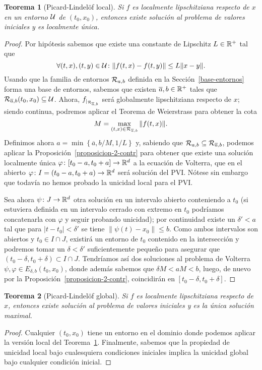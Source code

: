 \documentclass[11pt]{article}
\theoremstyle{plain}
\newtheorem{theorem}{Teorema}
\theoremstyle{definition}
\theoremstyle{remark}
\begin{document}
\begin{theorem}[Picard-Lindelöf local]\label{picard-lindelof-local}
  Si \(f\) es localmente lipschitziana respecto de \(x\) en un entorno ${\cal U}$ de \((t_0,x_0)\),
  entonces existe solución al problema de valores iniciales y es
  localmente única.
\end{theorem}
\begin{proof}
  Por hipótesis sabemos que existe una constante de Lipschitz $L \in \mathbb{R}^+$
  tal que
  \[ \forall (t,x),(t,y) \in {\cal U}\colon \| f(t,x) - f(t,y) \| \leq L\|x-y\|. \]
  Usando que la familia de entornos ${{\cal{R}}}_{a,b}$ definida en la Sección~\ref{base-entornos}
  forma una base de entornos, sabemos que existen $\overline{a},b \in \mathbb{R}^+$ tales que ${{\cal{R}}}_{\overline{a},b}(t_0,x_0) \subseteq {\cal U}$.
  Ahora, $f_{|_{{{\cal{R}}}_{\overline{a},b}}}$ será globalmente lipschitziana respecto de $x$;
  siendo continua, podremos aplicar el Teorema de Weierstrass para obtener la cota
  \[M = \max_{(t,x) \in {{\cal{R}}}_{\overline{a},b}} \|f(t,x)\|.\]
  Definimos ahora $a = \min\left\{ \overline{a}, b/M, 1/L \right\}$ y, sabiendo que ${{\cal{R}}}_{a,b} \subseteq {{\cal{R}}}_{\overline{a},b}$, podemos aplicar
  la Proposición~\ref{proposicion-2-contr} para obtener que existe una solución
  localmente única $\varphi \colon [t_0-a,t_0+a] \to \mathbb{R}^d$ a la ecuación de Volterra, que en el
  abierto $\varphi \colon I = (t_0-a,t_0+a) \to \mathbb{R}^d$ será solución del PVI\@. Nótese sin embargo que
  todavía no hemos probado la unicidad local para el PVI\@.
  
  Sea ahora $\psi \colon J \to \mathbb{R}^d$ otra solución en un intervalo abierto conteniendo
  a $t_0$ (si estuviera definida en un intervalo cerrado con extremo en $t_0$ podríamos
  concatenarla con $\varphi$ y seguir probando unicidad); por continuidad existe un $\delta' < a$
  tal que para $|t - t_0| < \delta'$ se tiene $\|\psi(t) - x_0\| \leq b$. Como ambos
  intervalos son abiertos y $t_0 \in I \cap J$, existirá
  un entorno de $t_0$ contenido en la intersección y podremos tomar un
  $\delta < \delta'$ suficientemente pequeño para asegurar que $(t_0-\delta, t_0+\delta) \subset I \cap J$.
  Tendríamos así dos soluciones al problema de Volterra $\psi,\varphi \in E_{\delta,b}(t_0,x_0)$,
  donde además sabemos que $\delta M < aM < b$, luego, de nuevo por la
  Proposición~\ref{proposicion-2-contr}, coincidirán en $[t_0-\delta,t_0+\delta]$.
\end{proof}


\begin{theorem}[Picard-Lindelöf global]\label{picard-lindelof-global}
  Si \(f\) es localmente lipschitziana respecto de \(x\), entonces existe solución
  al problema de valores iniciales y es la única solución maximal.
\end{theorem}
\begin{proof}
  Cualquier $(t_0,x_0)$ tiene un entorno en el dominio donde podemos aplicar
  la versión local del Teorema~\ref{picard-lindelof-local}. Finalmente, sabemos
  que la propiedad de unicidad local bajo cualesquiera condiciones iniciales
  implica la unicidad global bajo cualquier condición inicial.
\end{proof}
\end{document}
